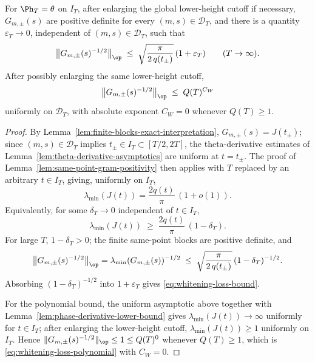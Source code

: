 \begin{lemma}
\label{lem:whitening-loss}
For \(\Ph_T = \theta\) on \(I_T\), after enlarging the global
lower-height cutoff if necessary, \(G_{m,\pm}(s)\) are positive
definite for every \((m,s)\in\mathcal D_T\), and there is a quantity
\(\varepsilon_T\to 0\), independent of \((m,s)\in\mathcal D_T\), such
that
\begin{equation}
\label{eq:whitening-loss-bound}
        \bigl\|G_{m,\pm}(s)^{-1/2}\bigr\|_{\op}
        \;\le\;
        \sqrt{\frac{\pi}{2\,q(t_\pm)}}\,(1+\varepsilon_T)
        \qquad (T\to\infty).
\end{equation}
After possibly enlarging the same lower-height cutoff,
\begin{equation}
\label{eq:whitening-loss-polynomial}
        \bigl\|G_{m,\pm}(s)^{-1/2}\bigr\|_{\op}
        \;\le\; Q(T)^{C_W}
\end{equation}
uniformly on \(\mathcal D_T\), with absolute exponent \(C_W = 0\)
whenever \(Q(T)\ge 1\).
\end{lemma}

\begin{proof}
By Lemma~\ref{lem:finite-blocks-exact-interpretation},
\(G_{m,\pm}(s) = J(t_\pm)\); since \((m,s)\in\mathcal D_T\) implies
\(t_\pm\in I_T\subset[T/2, 2T]\), the theta-derivative estimates of
Lemma~\ref{lem:theta-derivative-asymptotics} are uniform at
\(t = t_\pm\).  The proof of Lemma~\ref{lem:same-point-gram-positivity}
then applies with \(T\) replaced by an arbitrary \(t\in I_T\), giving,
uniformly on \(I_T\),
\[
        \lambda_{\min}(J(t))
        = \frac{2q(t)}{\pi}\,(1 + o(1)).
\]
Equivalently, for some \(\delta_T\to 0\) independent of \(t\in I_T\),
\[
        \lambda_{\min}(J(t))
        \;\ge\; \frac{2q(t)}{\pi}\,(1-\delta_T).
\]
For large \(T\), \(1-\delta_T > 0\); the finite same-point blocks are
positive definite, and
\[
        \bigl\|G_{m,\pm}(s)^{-1/2}\bigr\|_{\op}
        = \lambda_{\min}(G_{m,\pm}(s))^{-1/2}
        \;\le\; \sqrt{\frac{\pi}{2\,q(t_\pm)}}\,(1-\delta_T)^{-1/2}.
\]
Absorbing \((1-\delta_T)^{-1/2}\) into \(1+\varepsilon_T\) gives
\eqref{eq:whitening-loss-bound}.

For the polynomial bound, the uniform asymptotic above together with
Lemma~\ref{lem:phase-derivative-lower-bound} gives
\(\lambda_{\min}(J(t))\to\infty\) uniformly for \(t\in I_T\); after
enlarging the lower-height cutoff,
\(\lambda_{\min}(J(t))\ge 1\) uniformly on \(I_T\).  Hence
\(\|G_{m,\pm}(s)^{-1/2}\|_{\op}\le 1\le Q(T)^0\) whenever
\(Q(T)\ge 1\), which is \eqref{eq:whitening-loss-polynomial} with
\(C_W = 0\).
\end{proof}

